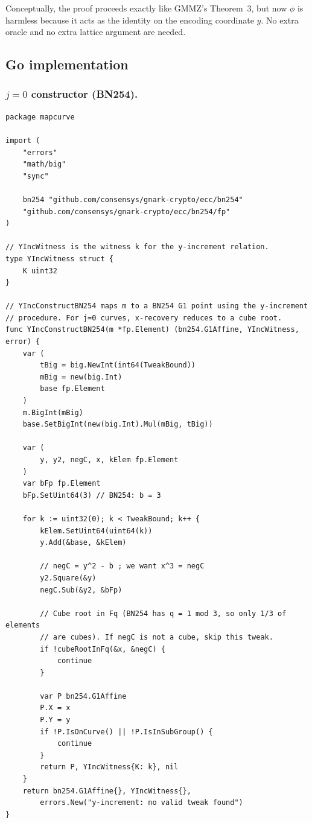 \documentclass[11pt,a4paper]{article}
\theoremstyle{definition}
\begin{document}
\noindent Conceptually, the proof proceeds exactly like GMMZ's Theorem~3,
but now $\phi$ is harmless because it acts as the identity on the encoding
coordinate $y$. No extra oracle and no extra lattice argument are needed.

\subsection{Go implementation}

\subsubsection*{$j=0$ constructor (BN254).}

\begin{lstlisting}[caption={y-increment constructor for BN254 ($j=0$).},
label={lst:y-inc-go}]
package mapcurve

import (
    "errors"
    "math/big"
    "sync"

    bn254 "github.com/consensys/gnark-crypto/ecc/bn254"
    "github.com/consensys/gnark-crypto/ecc/bn254/fp"
)

// YIncWitness is the witness k for the y-increment relation.
type YIncWitness struct {
    K uint32
}

// YIncConstructBN254 maps m to a BN254 G1 point using the y-increment
// procedure. For j=0 curves, x-recovery reduces to a cube root.
func YIncConstructBN254(m *fp.Element) (bn254.G1Affine, YIncWitness, error) {
    var (
        tBig = big.NewInt(int64(TweakBound))
        mBig = new(big.Int)
        base fp.Element
    )
    m.BigInt(mBig)
    base.SetBigInt(new(big.Int).Mul(mBig, tBig))

    var (
        y, y2, negC, x, kElem fp.Element
    )
    var bFp fp.Element
    bFp.SetUint64(3) // BN254: b = 3

    for k := uint32(0); k < TweakBound; k++ {
        kElem.SetUint64(uint64(k))
        y.Add(&base, &kElem)

        // negC = y^2 - b ; we want x^3 = negC
        y2.Square(&y)
        negC.Sub(&y2, &bFp)

        // Cube root in Fq (BN254 has q = 1 mod 3, so only 1/3 of elements
        // are cubes). If negC is not a cube, skip this tweak.
        if !cubeRootInFq(&x, &negC) {
            continue
        }

        var P bn254.G1Affine
        P.X = x
        P.Y = y
        if !P.IsOnCurve() || !P.IsInSubGroup() {
            continue
        }
        return P, YIncWitness{K: k}, nil
    }
    return bn254.G1Affine{}, YIncWitness{},
        errors.New("y-increment: no valid tweak found")
}


\end{lstlisting}
\end{document}
